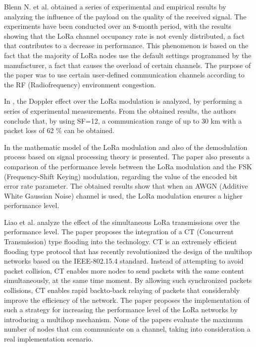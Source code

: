 Blenn N.
et al.
\cite{blenn_lorawan_2017} obtained a series of experimental and empirical results by analyzing the influence of the payload on the quality of the received signal.
The experiments have been conducted over an 8-month period,
	with the results showing that the LoRa channel occupancy rate is not evenly distributed,
	a fact that contributes to a decrease in performance.
This phenomenon is based on the fact that the majority of LoRa nodes use the default settings programmed by the manufacturer,
	a fact that causes the overload of certain channels.
The purpose of the paper was to use certain user-defined communication channels according to the RF (Radiofrequency) environment congestion.

In \cite{petajajarvi_performance_2017},
	the Doppler effect over the LoRa modulation is analyzed,
	by performing a series of experimental measurements.
From the obtained results,
	the authors conclude that,
	by using SF=12,
	a communication range of up to 30 km with a packet loss of 62 \% can be obtained.

In \cite{vangelista_frequency_2017} the mathematic model of the LoRa modulation and also of the demodulation process based on signal processing theory is presented.
The paper also presents a comparison of the performance levels between the LoRa modulation and the FSK (Frequency-Shift Keying) modulation,
	regarding the value of the encoded bit error rate parameter.
The obtained results show that when an AWGN (Additive White Gaussian Noise) channel is used,
	the LoRa modulation ensures a higher performance level.

Liao et al.
\cite{liao_multi-hop_2017} analyze the effect of the simultaneous LoRa transmissions over the performance level.
The paper proposes the integration of a CT (Concurrent Transmission) type flooding into the technology.
CT is an extremely efficient flooding type protocol that has recently revolutionized the design of the multihop networks based on the IEEE-802.15.4 standard.
Instead of attempting to avoid packet collision,
	CT enables more nodes to send packets with the same content simultaneously,
	at the same time moment.
By allowing such synchronized packets collisions,
	CT enables rapid backto-back relaying of packets that considerably improve the efficiency of the network.
The paper proposes the implementation of such a strategy for increasing the performance level of the LoRa networks by introducing a multihop mechanism.
None of the papers evaluate the maximum number of nodes that can communicate on a channel,
	taking into consideration a real implementation scenario.


